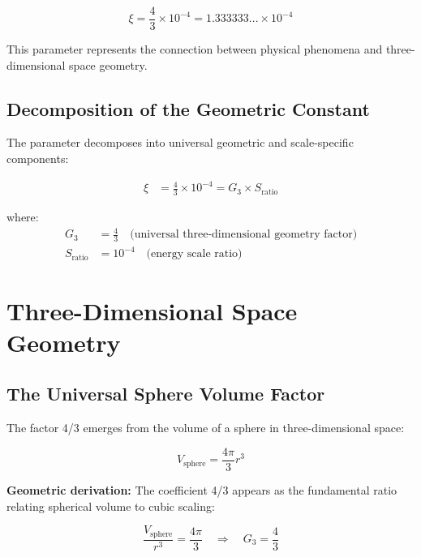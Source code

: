 \documentclass[12pt,a4paper]{report}
\begin{document}
\begin{equation}
	\boxed{\xi = \frac{4}{3} \times 10^{-4} = 1.333333... \times 10^{-4}}
	\label{eq:xi_exact}
\end{equation}

This parameter represents the connection between physical phenomena and three-dimensional space geometry.

\subsection{Decomposition of the Geometric Constant}
\label{subsec:decomposition}

The parameter decomposes into universal geometric and scale-specific components:

\begin{align}
	\xi &= \frac{4}{3} \times 10^{-4} = G_3 \times S_{\text{ratio}}
\end{align}

where:
\begin{align}
	G_3 &= \frac{4}{3} \quad \text{(universal three-dimensional geometry factor)} \\
	S_{\text{ratio}} &= 10^{-4} \quad \text{(energy scale ratio)}
\end{align}

\section{Three-Dimensional Space Geometry}
\label{sec:3d_space_geometry}

\subsection{The Universal Sphere Volume Factor}
\label{subsec:sphere_volume_factor}

The factor 4/3 emerges from the volume of a sphere in three-dimensional space:

\begin{equation}
	V_{\text{sphere}} = \frac{4\pi}{3} r^3
\end{equation}

\textbf{Geometric derivation:}
The coefficient 4/3 appears as the fundamental ratio relating spherical volume to cubic scaling:

\begin{equation}
	\frac{V_{\text{sphere}}}{r^3} = \frac{4\pi}{3} \quad \Rightarrow \quad G_3 = \frac{4}{3}
\end{equation}
\end{document}
